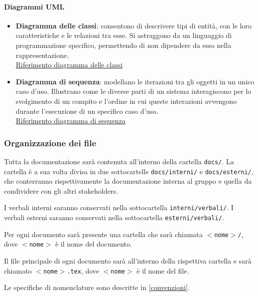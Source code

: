 \documentclass[a4paper, 12pt]{article}
\begin{document}
\paragraph{Diagrammi UML}
\begin{itemize}
	\item \textbf{Diagramma delle classi}: consentono di descrivere tipi di entità, con le loro caratteristiche e le 
	relazioni tra esse. Si astraggono da un linguaggio di programmazione specifico, permettendo di non 
	dipendere da esso nella rappresentazione.\\
	\href{https://www.math.unipd.it/~rcardin/swea/2021/Diagrammi%20delle%20Classi_4x4.pdf}{\underline{Riferimento diagramma delle classi}}
	\item \textbf{Diagramma di sequenza}: modellano le iterazioni tra gli oggetti in un unico caso d'uso. Illustrano come 
	le diverse parti di un sistema interagiscono per lo svolgimento di un compito e l'ordine in cui queste interazioni
	avvengono durante l'esecuzione di un specifico caso d'uso.\\
	\href{https://www.math.unipd.it/~rcardin/swea/2022/Diagrammi%20di%20Sequenza.pdf}{\underline{Riferimento diagramma di sequenza}}

\end{itemize}

\subsubsection{Organizzazione dei file}
Tutta la documentazione sarà contenuta all'interno della cartella \texttt{docs/}. La cartella è a sua volta divisa in due sottocartelle \texttt{docs/interni/} e \texttt{docs/esterni/}, che conterranno rispettivamente la documentazione interna al gruppo e quella da condividere con gli altri stakeholders.

I verbali interni saranno conservati nella sottocartella \texttt{interni/verbali/}.
I verbali esterni saranno conservati nella sottocartella \texttt{esterni/verbali/}.

Per ogni documento sarà presente una cartella che sarà chiamata \texttt{$<$nome$>$/}, dove \texttt{$<$nome$>$} è il nome del documento.

Il file principale di ogni documento sarà all'interno della rispettiva cartella e sarà chiamato \texttt{$<$nome$>$.tex}, dove \texttt{$<$nome$>$} è il nome del file.

Le specifiche di nomenclature sono descritte in \ref{convenzioni}.
\end{document}
